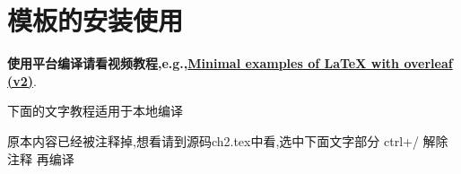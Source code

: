 
\section{模板的安装使用}\label{ch:install}

\textbf{使用平台编译请看视频教程,e.g.,\href{https://www.youtube.com/playlist?list=PLnC5h3PY-znyDQKn3knfXfekZLgWyL7QW}{Minimal examples of LaTeX with overleaf (v2)}}.

下面的文字教程适用于本地编译

原本内容已经被注释掉,想看请到源码ch2.tex中看,选中下面文字部分  ctrl+/  解除注释 再编译









